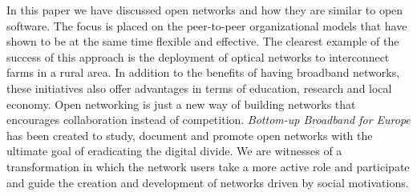 \documentclass[journal]{IEEEtran}
\begin{document}
In this paper we have discussed open networks and how they are similar to open software.
The focus is placed on the peer-to-peer organizational models that have shown to be at the same time flexible and effective.
The clearest example of the success of this approach is the deployment of optical networks to interconnect farms in a rural area.
In addition to the benefits of having broadband networks, these initiatives also offer advantages in terms of education, research and local economy.
Open networking is just a new way of building networks that encourages collaboration instead of competition.
\emph{Bottom-up Broadband for Europe} has been created to study, document and promote open networks with the ultimate goal of eradicating the digital divide.
We are witnesses of a transformation in which the network users take a more active role and participate and guide the creation and development of networks driven by social motivations.


%
%



%
%
\end{document}
